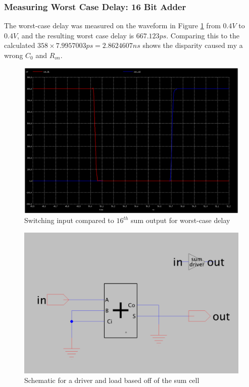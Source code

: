 \documentclass{article}
\begin{document}
\subsubsection{Measuring Worst Case Delay: 16 Bit Adder}
The worst-case delay was measured on the waveform in Figure \ref{fig:baseline_worst_case_delay} from $0.4V$ to $0.4V$, and the resulting worst case delay is $667.123ps$. Comparing this to the calculated $358 \times 7.9957003ps = 2.8624607ns$ shows the disparity caused my a wrong $C_0$ and $R_{on}$.

\begin{figure}[H]
  \includegraphics[width=\linewidth]{baseline_screenshots/baseline_worst_case_sum_delay.png}
  \caption{Switching input compared to $16^{th}$ sum output for worst-case delay}
  \label{fig:baseline_worst_case_delay}
\end{figure}

\begin{figure}[H]
  \includegraphics[width=\linewidth]{baseline_screenshots/baseline_sum_driver.png}
  \caption{Schematic for a driver and load based off of the sum cell}
  \label{fig:baseline_sum_driver_sch}
\end{figure}
\end{document}
